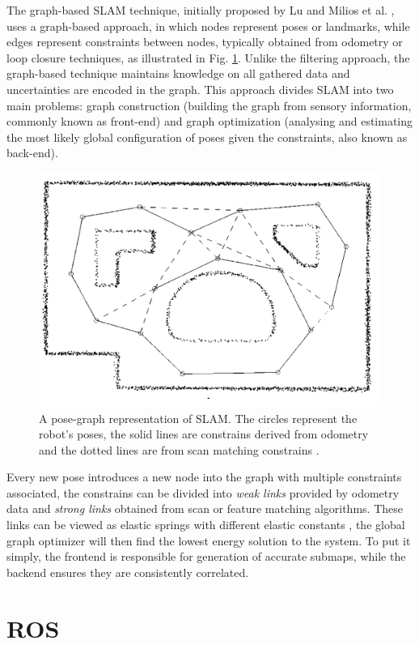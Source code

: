 The graph-based \acs*{SLAM} technique, initially proposed by Lu and Milios et al. \cite{lu_globally_1997}, uses a graph-based approach, in which nodes represent poses or landmarks, while edges represent constraints between nodes, typically obtained from odometry or loop closure techniques, as illustrated in Fig. \ref*{fig: graph SLAM}. Unlike the filtering approach, the graph-based technique maintains knowledge on all gathered data and uncertainties are encoded in the graph. This approach divides \acs*{SLAM} into two main problems: graph construction (building the graph from sensory information, commonly known as front-end) and graph optimization (analysing and estimating the most likely global configuration of poses given the constraints, also known as back-end).

\begin{figure}[H]
    \centering
    \includegraphics[width=0.7\linewidth]{images/background/graph_SLAM.png}
    \caption{A pose-graph representation of \acs*{SLAM}. The circles represent the robot's poses, the solid lines are constrains derived from odometry and the dotted lines are from scan matching constrains \cite{lu_globally_1997}.}
    \label{fig: graph SLAM}
\end{figure}

Every new pose introduces a new node into the graph with multiple constraints associated, the constrains can be divided into \textit{weak links} provided by odometry data and \textit{strong links} obtained from scan or feature matching algorithms. These links can be viewed as elastic springs with different elastic constants \cite{lu_globally_1997}, the global graph optimizer will then find the lowest energy solution to the system. To put it simply, the frontend is responsible for generation of accurate submaps, while the backend ensures they are consistently correlated.

\section{\acs{ROS}}

